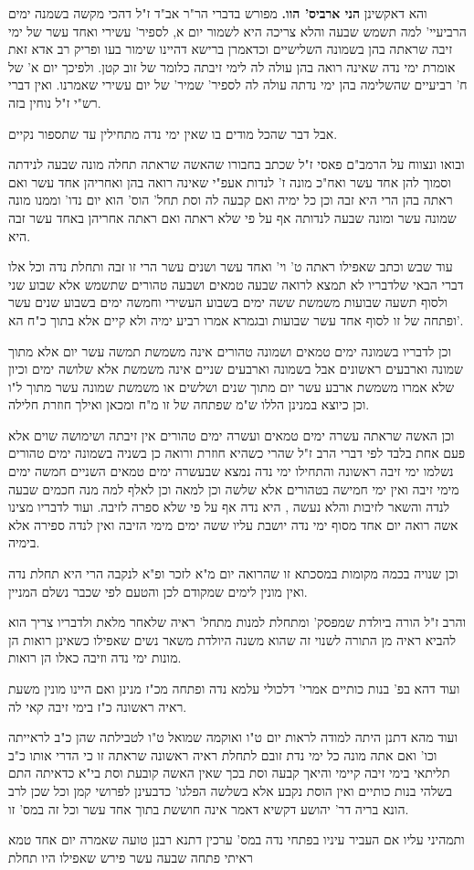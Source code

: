 \documentclass[12pt, openany]{book}
\begin{document}
{והא דאקשינן \textbf{הני ארביס' הוו.} מפורש בדברי הר"ר אב"ד ז"ל דהכי מקשה בשמנה ימים הרביעיי' למה תשמש שבעה והלא צריכה היא לשמור יום א, לספיר' עשירי ואחד עשר של ימי זיבה שראתה בהן בשמונה השלישיים וכדאמרן ברישא דהיינו שימור בעו ופריק רב אדא זאת אומרת ימי נדה שאינה רואה בהן עולה לה לימי זיבתה כלומר של זוב קטן. ולפיכך יום א' של ח' רביעיים שהשלימה בהן ימי נדתה עולה לה לספיר' שמיר' של יום עשירי שאמרנו. ואין דברי רש"י ז"ל נוחין בזה.\par אבל דבר שהכל מודים בו שאין ימי נדה מתחילין עד שתספור נקיים.\par ובואו ונצווח על הרמב"ם פאסי ז"ל שכתב בחבורו שהאשה שראתה תחלה מונה שבעה לנידתה וסמוך להן אחד עשר ואח"כ מונה ז' לנדות אעפ"י שאינה רואה בהן ואחריהן אחד עשר ואם ראתה בהן הרי היא זבה וכן כל ימיה ואם קבעה לה וסת תחל' הוס' הוא יום נדו' וממנו מונה שמונה עשר ומונה שבעה לנדותה אף על פי שלא ראתה ואם ראתה אחריהן באחד עשר זבה היא.\par עוד שבש וכתב שאפילו ראתה ט' וי' ואחד עשר ושנים עשר הרי זו זבה ותחלת נדה וכל אלו דברי הבאי שלדבריו לא תמצא לרואה שבעה טמאים ושבעה טהורים שתשמש אלא שבוע שני ולסוף תשעה שבועות משמשת ששה ימים בשבוע העשירי וחמשה ימים בשבוע שנים עשר ופתחה של זו לסוף אחד עשר שבועות ובגמרא אמרו רביע ימיה ולא קיים אלא בתוך כ"ח הא'.\par וכן לדבריו בשמונה ימים טמאים ושמונה טהורים אינה משמשת תמשה עשר יום אלא מתוך שמונה וארבעים ראשונים אבל בשמונה וארבעים שניים אינה משמשת אלא שלושה ימים וכיון שלא אמרו משמשת ארבע עשר יום מתוך שנים ושלשים או משמשת שמונה עשר מתוך ל"ו וכן כיוצא במנינן הללו ש"מ שפתחה של זו מ"ח ומכאן ואילך חוזרת חלילה.\par וכן האשה שראתה עשרה ימים טמאים ועשרה ימים טהורים אין זיבתה ושימושה שוים אלא פעם אחת בלבד לפי דברי הרב ז"ל שהרי כשהיא חוזרת ורואה כן בשניה בשמונה ימים טהורים נשלמו ימי זיבה ראשונה והתחילו ימי נדה נמצא שבעשרה ימים טמאים השניים חמשה ימים מימי זיבה ואין ימי חמישה בטהורים אלא שלשה וכן למאה וכן לאלף למה מנה חכמים שבעה לנדה והשאר לזיבות והלא נעשה , היא נדה אף על פי שלא ספרה לזיבה. ועוד לדבריו מצינו אשה רואה יום אחד מסוף ימי נדה יושבת עליו ששה ימים מימי הזיבה ואין לנדה ספירה אלא בימיה.\par וכן שנויה בכמה מקומות במסכתא זו שהרואה יום מ"א לזכר ופ"א לנקבה הרי היא תחלת נדה ואין מונין לימים שמקודם לכן והטעם לפי שכבר נשלם המניין.\par והרב ז"ל הורה ביולדת שמפסק' ומתחלת למנות מתחל' ראיה שלאחר מלאת ולדבריו צריך הוא להביא ראיה מן התורה לשנוי זה שהוא משנה היולדת משאר נשים שאפילו כשאינן רואות הן מונות ימי נדה וזיבה כאלו הן רואות.\par ועוד דהא בפ' בנות כותיים אמרי' דלכולי עלמא נדה ופתחה מכ"ז מנינן ואם היינו מונין משעת ראיה ראשונה כ"ז בימי זיבה קאי לה.\par ועוד מהא דתנן היתה למודה לראות יום ט"ו ואוקמה שמואל ט"ו לטבילתה שהן כ"ב לראייתה וכו' ואם אתה מונה כל ימי נדת זובם לתחלת ראיה ראשונה שראתה זו כי הדרי אותו כ"ב תליתאי בימי זיבה קיימי והיאך קבעה וסת בכך שאין האשה קובעת וסת בי"א כדאיתה התם בשלהי בנות כותיים ואין הוסת נקבע אלא בשלשה הפלגו' כדבעינן לפרושי קמן וכל שכן לרב הונא בריה דר' יהושע דקשיא דאמר אינה חוששת בתוך אחד עשר וכל זה במס' זו.\par ותמהיני עליו אם העביר עיניו בפתחי נדה במס' ערכין דתנא רבנן טועה שאמרה יום אחד טמא ראיתי פתחה שבעה עשר פירש שאפילו היו תחלת }
\end{document}
